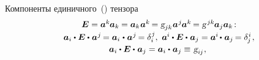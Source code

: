 \begin{otherlanguage}{russian}
Компоненты единичного~() тензора %
\vspace{0.1em}\begin{equation}\begin{array}{c}
\bm{E} = \bm{a}^{k} \hspace{-0.1ex} \bm{a}_{k} \hspace{-0.1ex} = \bm{a}_{k} \hspace{0.1ex} \bm{a}^{k} \hspace{-0.2ex} = \textsl{g}_{jk} \hspace{0.1ex} \bm{a}^{\hspace{0.1ex}j} \hspace{-0.1ex} \bm{a}^{k} \hspace{-0.2ex} = \textsl{g}^{\hspace{0.25ex}jk} \hspace{-0.1ex} \bm{a}_j \bm{a}_k \hspace{-0.32ex}: \\[0.2em]
%
\bm{a}_i \dotp \bm{E} \dotp \hspace{0.1ex} \bm{a}^{\hspace{0.1ex}j} \hspace{-0.2ex} = \bm{a}_i \hspace{0.1ex} \dotp \hspace{0.1ex} \bm{a}^{\hspace{0.1ex}j} \hspace{-0.2ex} = \delta_i^{\hspace{0.1ex}j} , \hspace{0.32em}
\bm{a}^{\hspace{-0.05ex}i} \dotp \bm{E} \dotp \hspace{0.1ex} \bm{a}_j = \bm{a}^{\hspace{-0.05ex}i} \hspace{-0.2ex} \dotp \hspace{0.1ex} \bm{a}_j \hspace{-0.2ex} = \delta_{\hspace{-0.1ex}j}^{\hspace{0.1ex}i} \hspace{0.2ex},
\\[0.2em]
%
\bm{a}_i \dotp \bm{E} \dotp \hspace{0.1ex} \bm{a}_j = \bm{a}_i \dotp \hspace{0.1ex} \bm{a}_j \equiv \hspace{0.16ex} \textsl{g}_{i\hspace{-0.1ex}j} \hspace{0.1ex} , \hspace{0.32em}

\end{array}
\end{equation}
\end{otherlanguage}
